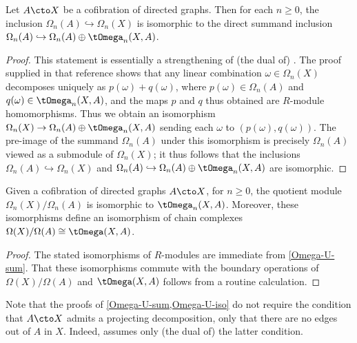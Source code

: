 \begin{lemma}\label{Omega-U-sum}
Let $A \cto X$ be a cofibration of directed graphs. Then for each $n \geq 0$, the inclusion $\Omega_n(A) \hookrightarrow \Omega_n(X)$ is isomorphic to the direct summand inclusion $\Omega_n(A) \hookrightarrow \Omega_n(A) \oplus \tOmega_n(X,A)$.
\end{lemma}

\begin{proof}
This statement is essentially a strengthening of (the dual of) \cite[Lem.~3.10]{grigor'yan-jimenez-muranov-yau}. The proof supplied in that reference shows that any linear combination $\omega \in \Omega_n(X)$ decomposes uniquely as $p(\omega) + q(\omega)$, where $p(\omega) \in \Omega_n(A)$ and $q(\omega) \in \tOmega_n(X,A)$, and the maps $p$ and $q$ thus obtained are $R$-module homomorphisms. Thus we obtain an isomorphism $\Omega_n(X) \to \Omega_n(A) \oplus \tOmega_n(X,A)$ sending each $\omega$ to $(p(\omega),q(\omega))$. The pre-image of the summand $\Omega_n(A)$ under this isomorphism is precisely $\Omega_n(A)$ viewed as a submodule of $\Omega_n(X)$; it thus follows that the inclusions $\Omega_n(A) \hookrightarrow \Omega_n(X)$ and $\Omega_n(A) \hookrightarrow \Omega_n(A) \oplus \tOmega_n(X,A)$ are isomorphic.
\end{proof}

\begin{corollary} \label{Omega-U-iso}
Given a cofibration of directed graphs $A \cto X$, for $n \geq 0$, the quotient module $\Omega_n(X) / \Omega_n(A)$ is isomorphic to $\tOmega_n(X,A)$. Moreover, these isomorphisms define an isomorphism of chain complexes $\Omega(X) / \Omega(A) \cong \tOmega(X,A)$.
\end{corollary}

\begin{proof}
The stated isomorphisms of $R$-modules are immediate from \cref{Omega-U-sum}. That these isomorphisms commute with the boundary operations of $\Omega(X) / \Omega(A)$ and $\tOmega(X,A)$ follows from a routine calculation.
\end{proof}

\begin{remark}
Note that the proofs of \cref{Omega-U-sum,Omega-U-iso} do not require the condition that $A \cto X$ admits a projecting decomposition, only that there are no edges out of $A$ in $X$. Indeed, \cite[Lem.~3.10]{grigor'yan-jimenez-muranov-yau} assumes only (the dual of) the latter condition.
\end{remark}

